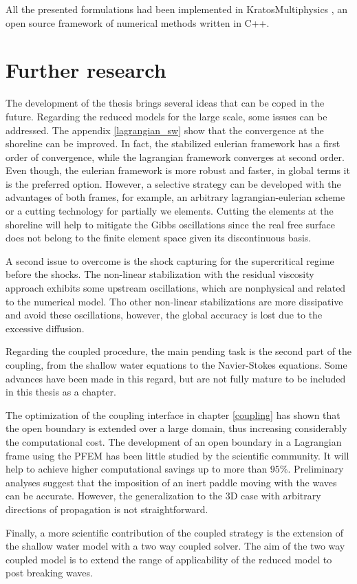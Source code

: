 All the presented formulations had been implemented in KratosMultiphysics \cite{dadvand2010, dadvand2013}, an open source framework of numerical methods written in C++.



\section{Further research}


The development of the thesis brings several ideas that can be coped in the future.
Regarding the reduced models for the large scale, some issues can be addressed. The appendix \ref{lagrangian_sw} show that the convergence at the shoreline can be improved. In fact, the stabilized eulerian framework has a first order of convergence, while the lagrangian framework converges at second order. Even though, the eulerian framework is more robust and faster, in global terms it is the preferred option. However, a selective strategy can be developed with the advantages of both frames, for example, an arbitrary lagrangian-eulerian scheme or a cutting technology for partially we elements. Cutting the elements at the shoreline will help to mitigate the Gibbs oscillations since the real free surface does not belong to the finite element space given its discontinuous basis.

A second issue to overcome is the shock capturing for the supercritical regime before the shocks. The non-linear stabilization with the residual viscosity approach exhibits some upstream oscillations, which are nonphysical and related to the numerical model. Tho other non-linear stabilizations are more dissipative and avoid these oscillations, however, the global accuracy is lost due to the excessive diffusion.

Regarding the coupled procedure, the main pending task is the second part of the coupling, from the shallow water equations to the Navier-Stokes equations. Some advances have been made in this regard, but are not fully mature to be included in this thesis as a chapter.

The optimization of the coupling interface in chapter \ref{coupling} has shown that the open boundary is extended over a large domain, thus increasing considerably the computational cost. The development of an open boundary in a Lagrangian frame using the PFEM has been little studied by the scientific community. It will help to achieve higher computational savings up to more than $95\%$. Preliminary analyses suggest that the imposition of an inert paddle moving with the waves can be accurate. However, the generalization to the 3D case with arbitrary directions of propagation is not straightforward.

Finally, a more scientific contribution of the coupled strategy is the extension of the shallow water model with a two way coupled solver. The aim of the two way coupled model is to extend the range of applicability of the reduced model to post breaking waves.

